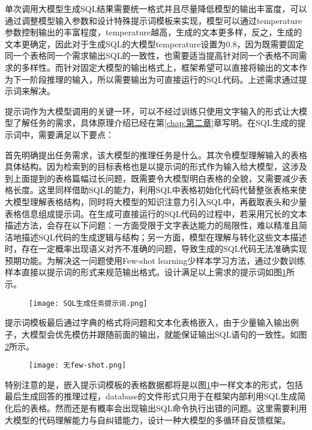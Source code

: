 单次调用大模型生成SQL结果需要统一格式并且尽量降低模型的输出丰富度，可以通过调整模型输入参数和设计特殊提示词模板来实现，模型可以通过temperature参数控制输出的丰富程度，temperature越高，生成的文本更多样，反之，生成的文本更确定，因此对于生成SQL的大模型temperature设置为0.8，因为既需要固定同一个表格同一个需求输出SQL的一致性，也需要适当提高针对同一个表格不同需求的多样性。而针对固定大模型的输出格式上，框架希望可以直接将输出的文本作为下一阶段推理的输入，所以需要输出为可直接运行的SQL代码。上述需求通过提示词来解决。

提示词作为大模型调用的关键一环，可以不经过训练只使用文字输入的形式让大模型了解任务的需求，具体原理介绍已经在第\ref{chap:第二章}章写明。在SQL生成的提示词中，需要满足以下要点：

首先明确提出任务需求，该大模型的推理任务是什么。其次令模型理解输入的表格具体结构。因为检索到的目标表格也是以提示词的形式作为输入给大模型，这涉及到上面提到的表格篇幅过长问题，既需要令大模型明白表格的全貌，又需要减少表格长度。这里同样借助SQL的能力，利用SQL中表格初始化代码代替整张表格来使大模型理解表格结构，同时将大模型的知识注意力引入SQL中，再截取表头和少量表格信息组成提示词。在生成可直接运行的SQL代码的过程中，若采用冗长的文本描述方法，会存在以下问题：一方面受限于文字表达能力的局限性，难以精准且简洁地描述SQL代码的生成逻辑与结构；另一方面，模型在理解与转化这些文本描述时，存在一定概率出现语义对齐不准确的问题，导致生成的SQL代码无法准确实现预期功能。为解决这一问题使用Few-shot learning少样本学习方法，通过少数训练样本直接以提示词的形式来规范输出格式。设计满足以上需求的提示词如图\ref{fig:4-5}所示。
\begin{figure}[h]
    \centering
    \texttt{[image: SQL生成任务提示词.png]}
    \label{fig:4-5}
\end{figure}

提示词模板最后通过字典的格式将问题和文本化表格嵌入，由于少量输入输出例子，大模型会优先模仿并跟随前面的输出，就能保证输出SQL语句的一致性。如图\ref{fig:4-6}所示。
\begin{figure}[h]
    \centering
    \texttt{[image: 无few-shot.png]}
    \label{fig:4-6}
\end{figure}
特别注意的是，嵌入提示词模板的表格数据都将是以图\ref{fig:4-5}中一样文本的形式，包括最后生成回答的推理过程，database的文件形式只用于在框架内部利用SQL生成简化后的表格。然而还是有概率会出现输出SQL命令执行出错的问题。这里需要利用大模型的代码理解能力与自纠错能力，设计一种大模型的多循环自反馈框架。

